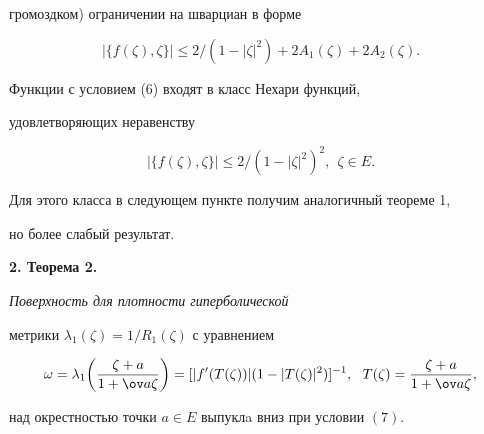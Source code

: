 громоздком) ограничении на шварциан в форме 


$$ 


|\{f(\zeta),\zeta\}|\le 2/(1-|\zeta|^2)+ 


2A_1(\zeta)+2A_2(\zeta). 


$$ 


 


Функции с условием (6) входят в класс Нехари функций, 


удовлетворяющих неравенству 


\begin{equation} 


|\{f(\zeta),\zeta\}|\le 2/(1-|\zeta|^2)^2,\ \ \zeta\in E. 


\end{equation} 


Для этого класса в следующем пункте получим аналогичный теореме 1, 


но более слабый результат. 


\medskip 


 


{\bf 2. Теорема 2.} {\it Поверхность для плотности гиперболической 


метрики $\lambda_1(\zeta)=1/R_1(\zeta)$ с уравнением 


$$ 


\omega=\lambda_1\bigg(\frac{\zeta+a}{1+\ov a\zeta} \bigg)= 


[|f'(T(\zeta))|(1-|T(\zeta)|^2)]^{-1}, 


\ \ T(\zeta)=\frac{\zeta+a}{1+\ov a\zeta}, 


$$ 


над окрестностью точки $a\in E$ выпуклa вниз при условии $(7)$.} 


 


